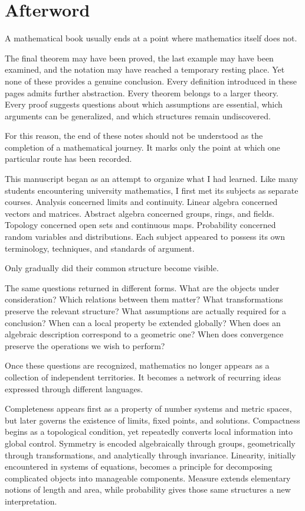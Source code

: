 \cleardoublepage
\chapter*{Afterword}
\thispagestyle{empty}

A mathematical book usually ends at a point where mathematics itself does not.

The final theorem may have been proved, the last example may have been examined, and the notation may have reached a temporary resting place. Yet none of these provides a genuine conclusion. Every definition introduced in these pages admits further abstraction. Every theorem belongs to a larger theory. Every proof suggests questions about which assumptions are essential, which arguments can be generalized, and which structures remain undiscovered.

For this reason, the end of these notes should not be understood as the completion of a mathematical journey. It marks only the point at which one particular route has been recorded.

This manuscript began as an attempt to organize what I had learned. Like many students encountering university mathematics, I first met its subjects as separate courses. Analysis concerned limits and continuity. Linear algebra concerned vectors and matrices. Abstract algebra concerned groups, rings, and fields. Topology concerned open sets and continuous maps. Probability concerned random variables and distributions. Each subject appeared to possess its own terminology, techniques, and standards of argument.

Only gradually did their common structure become visible.

The same questions returned in different forms. What are the objects under consideration? Which relations between them matter? What transformations preserve the relevant structure? What assumptions are actually required for a conclusion? When can a local property be extended globally? When does an algebraic description correspond to a geometric one? When does convergence preserve the operations we wish to perform?

Once these questions are recognized, mathematics no longer appears as a collection of independent territories. It becomes a network of recurring ideas expressed through different languages.

Completeness appears first as a property of number systems and metric spaces, but later governs the existence of limits, fixed points, and solutions. Compactness begins as a topological condition, yet repeatedly converts local information into global control. Symmetry is encoded algebraically through groups, geometrically through transformations, and analytically through invariance. Linearity, initially encountered in systems of equations, becomes a principle for decomposing complicated objects into manageable components. Measure extends elementary notions of length and area, while probability gives those same structures a new interpretation.

